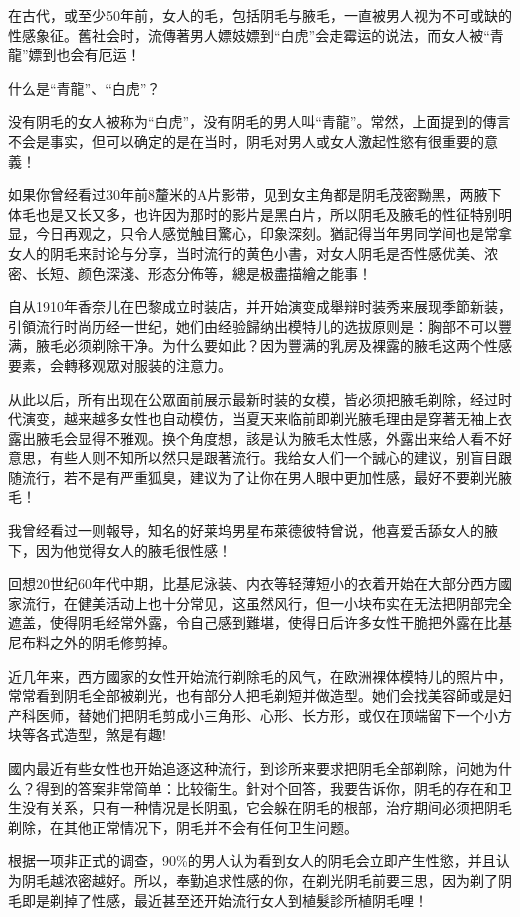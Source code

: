 \documentclass[12pt,UTF8]{ctexbook}
\begin{document}
在古代，或至少50年前，女人的毛，包括阴毛与腋毛，一直被男人视为不可或缺的性感象征。舊社会时，流傳著男人嫖妓嫖到“白虎”会走霉运的说法，而女人被“青龍”嫖到也会有厄运！

什么是“青龍”、“白虎”？

没有阴毛的女人被称为“白虎”，没有阴毛的男人叫“青龍”。常然，上面提到的傳言不会是事实，但可以确定的是在当时，阴毛对男人或女人激起性慾有很重要的意義！

如果你曾经看过30年前8釐米的A片影带，见到女主角都是阴毛茂密黝黑，两腋下体毛也是又长又多，也许因为那时的影片是黑白片，所以阴毛及腋毛的性征特别明显，今日再观之，只令人感觉触目驚心，印象深刻。猶記得当年男同学间也是常拿女人的阴毛来討论与分享，当时流行的黄色小書，对女人阴毛是否性感优美、浓密、长短、颜色深淺、形态分佈等，總是极盡描繪之能事！

自从1910年香奈儿在巴黎成立时装店，并开始演变成舉辩时装秀来展现季節新装，引領流行时尚历经一世纪，她们由经验歸纳出模特儿的选拔原则是：胸部不可以豐满，腋毛必须剃除干净。为什么要如此？因为豐满的乳房及裸露的腋毛这两个性感要素，会轉移观眾对服装的注意力。

从此以后，所有出现在公眾面前展示最新时装的女模，皆必须把腋毛剃除，经过时代演变，越来越多女性也自动模仿，当夏天来临前即剃光腋毛理由是穿著无袖上衣露出腋毛会显得不雅观。换个角度想，該是认为腋毛太性感，外露出来给人看不好意思，有些人则不知所以然只是跟著流行。我给女人们一个誠心的建议，别盲目跟随流行，若不是有严重狐臭，建议为了让你在男人眼中更加性感，最好不要剃光腋毛！

我曾经看过一则報导，知名的好莱坞男星布萊德彼特曾说，他喜爱舌舔女人的腋下，因为他觉得女人的腋毛很性感！

回想20世纪60年代中期，比基尼泳装、内衣等轻薄短小的衣着开始在大部分西方國家流行，在健美活动上也十分常见，这虽然风行，但一小块布实在无法把阴部完全遮盖，使得阴毛经常外露，令自己感到難堪，使得日后许多女性干脆把外露在比基尼布料之外的阴毛修剪掉。

近几年来，西方國家的女性开始流行剃除毛的风气，在欧洲裸体模特儿的照片中，常常看到阴毛全部被剃光，也有部分人把毛剃短并做造型。她们会找美容師或是妇产科医师，替她们把阴毛剪成小三角形、心形、长方形，或仅在顶端留下一个小方块等各式造型，煞是有趣!

國内最近有些女性也开始追逐这种流行，到诊所来要求把阴毛全部剃除，问她为什么？得到的答案非常简单：比较衞生。針对个回答，我要告诉你，阴毛的存在和卫生没有关系，只有一种情况是长阴虱，它会躲在阴毛的根部，治疗期间必须把阴毛剃除，在其他正常情况下，阴毛并不会有任何卫生问题。

根据一项非正式的调查，90\%的男人认为看到女人的阴毛会立即产生性慾，并且认为阴毛越浓密越好。所以，奉勤追求性感的你，在剃光阴毛前要三思，因为剃了阴毛即是剃掉了性感，最近甚至还开始流行女人到植髮診所植阴毛哩！
\end{document}
